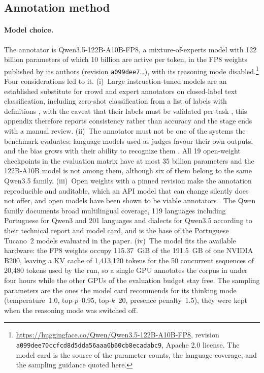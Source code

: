 \subsection{Annotation method}
\label{app:ka-short-method}

\paragraph{Model choice.} The annotator is Qwen3.5-122B-A10B-FP8, a
mixture-of-experts model with 122 billion parameters of which 10 billion are
active per token, in the FP8 weights published by its authors (revision
\texttt{a099dee7}\ldots), with its reasoning mode disabled.\footnote{\url{https://huggingface.co/Qwen/Qwen3.5-122B-A10B-FP8}, revision \texttt{a099dee70ccfcd8d5dda56aaa0b60cb8ecadabc9}, Apache 2.0 license. The model card is the source of the parameter counts, the language coverage, and the sampling guidance quoted here.} Four considerations led to it. (i)~Large instruction-tuned
models are an established substitute for crowd and expert annotators on
closed-label text classification, including zero-shot classification from a
list of labels with definitions
\citep{ding2023gpt3,he2024annollm,tan2024survey},
with the caveat that their labels must be validated per task
\citep{gligoric2025unconfident}, this appendix therefore reports consistency
rather than accuracy and the stage ends with a manual review. (ii)~The
annotator must not be one of the systems the benchmark evaluates: language
models used as judges favour their own outputs, and the bias grows with their
ability to recognize them \citep{panickssery2024llm,liu2024narcissistic}. All
19 open-weight checkpoints in the evaluation matrix have at most 35 billion
parameters and the 122B-A10B model is not among them, although six of them
belong to the same Qwen3.5 family. (iii)~Open weights with a pinned revision
make the annotation reproducible and auditable, which an API model that can
change silently does not offer, and open models have been shown to be viable
annotators \citep{alizadeh2025opensource}. The Qwen family documents broad
multilingual coverage, 119 languages including Portuguese for Qwen3
and 201 languages and dialects for Qwen3.5 according to their technical
report and model card, and is the base of the Portuguese Tucano~2 models
evaluated in the paper. (iv)~The model fits the
available hardware: the FP8 weights occupy 115.37~GiB of the 191.5~GB of one
NVIDIA B200, leaving a KV cache of 1,413,120 tokens for the 50 concurrent
sequences of 20,480 tokens used by the run, so a single GPU annotates the
corpus in under four hours while the other GPUs of the evaluation budget stay
free. The sampling parameters are the ones the model card recommends for its
thinking mode (temperature~1.0, top-$p$~0.95, top-$k$~20, presence
penalty~1.5), they were kept when the reasoning mode was switched off.

